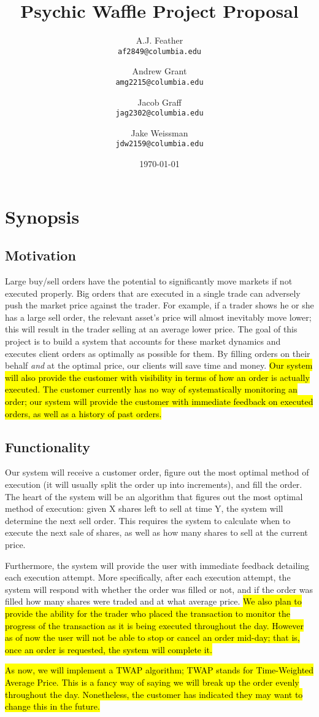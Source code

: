 \documentclass{article}
\title{Psychic Waffle Project Proposal}
\author{
    A.J. Feather\\
    \texttt{af2849@columbia.edu}
    \and
    Andrew Grant\\
    \texttt{amg2215@columbia.edu}
    \and
    Jacob Graff\\
    \texttt{jag2302@columbia.edu}
    \and
    Jake Weissman\\
    \texttt{jdw2159@columbia.edu}
}
\date{\today}
\begin{document}
\maketitle

\section{Synopsis}

\subsection{Motivation}
Large buy/sell orders have the potential to significantly move markets if not executed properly. Big orders that are executed in a single trade can adversely push the market price against the trader. For example, if a trader shows he or she has a large sell order, the relevant asset's price will almost inevitably move lower; this will result in the trader selling at an average lower price. The goal of this project is to build a system that accounts for these market dynamics and executes client orders as optimally as possible for them. By filling orders on their behalf \emph{and} at the optimal price, our clients will save time and money. \hl{Our system will also provide the customer with visibility in terms of how an order is actually executed. The customer currently has no way of systematically monitoring an order; our system will provide the customer with immediate feedback on executed orders, as well as a history of past orders. }

\subsection{Functionality} %
Our system will receive a customer order, figure out the most optimal method of execution (it will usually split the order up into increments), and fill the order. The heart of the system will be an algorithm that figures out the most optimal method of execution: given X shares left to sell at time Y, the system will determine the next sell order. This requires the system to calculate when to execute the next sale of shares, as well as how many shares to sell at the current price. 
\par
Furthermore, the system will provide the user with immediate feedback detailing each execution attempt. More specifically, after each execution attempt, the system will respond with whether the order was filled or not, and if the order was filled how many shares were traded and at what average price. \hl{We also plan to provide the ability for the trader who placed the transaction to monitor the progress of the transaction as it is being executed throughout the day. However as of now the user will not be able to stop or cancel an order mid-day; that is, once an order is requested, the system will complete it.}
\par
\hl{As now, we will implement a TWAP algorithm; TWAP stands for Time-Weighted Average Price. This is a fancy way of saying we will break up the order evenly throughout the day. Nonetheless, the customer has indicated they may want to change this in the future. }
\end{document}
